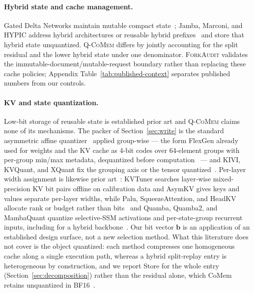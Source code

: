 \documentclass{article}
\newcommand{\qcomem}{\textsc{Q-CoMem}}
\newcommand{\method}{\textsc{ForkAudit}}
\begin{document}
\paragraph{Hybrid state and cache management.}
Gated Delta Networks maintain mutable compact state~\citep{yang2025gateddeltanet};
Jamba, Marconi, and HYPIC address hybrid architectures or reusable hybrid
prefixes~\citep{lieber2025jamba,pan2025marconi,liu2026hypic} and store that
hybrid state unquantized.  \qcomem{} differs by jointly accounting
for the split residual and the lower hybrid state under one denominator.
\method{} validates the
immutable-document/mutable-request boundary rather than replacing these cache
policies; Appendix
Table~\ref{tab:published-context} separates published numbers from our controls.

\paragraph{KV and state quantization.}
Low-bit storage of reusable state is established prior art and \qcomem{} claims
none of its mechanisms. The packer of Section~\ref{sec:write} is the standard
asymmetric affine quantizer~\citep{jacob2018quantization} applied group-wise
--- the form FlexGen already used for weights and the KV cache as 4-bit codes
over 64-element groups with per-group min/max metadata, dequantized before
computation~\citep{sheng2023flexgen} --- and KIVI, KVQuant, and XQuant fix the
grouping axis or the tensor
quantized~\citep{liu2024kivi,hooper2024kvquant,tomar2025xquant}. Per-layer
width assignment is likewise prior
art~\citep{li2025kvtuner,tao2025asymkv,yang2024mikv}: KVTuner searches
layer-wise mixed-precision KV bit pairs offline on calibration data and AsymKV
gives keys and values separate per-layer widths, while Palu, SqueezeAttention,
and HeadKV allocate rank or budget rather than
bits~\citep{chang2025palu,wang2025squeezeattention,fu2025headkv} and Quamba,
Quamba2, and MambaQuant quantize selective-SSM activations and per-state-group
recurrent inputs, including for a hybrid
backbone~\citep{chiang2025quamba,chiang2025quamba2,yue2025mambaquant}. Our bit vector $\mathbf b$ is an application of an established design surface,
not a new selection method. What this literature does not cover is the object
quantized: each method compresses one homogeneous cache along a single
execution path, whereas a hybrid split-replay entry is heterogeneous by
construction, and we report Store for the whole entry
(Section~\ref{sec:decomposition}) rather than the residual alone, which CoMem
retains unquantized in BF16~\citep{liu2026comem}.
\end{document}
